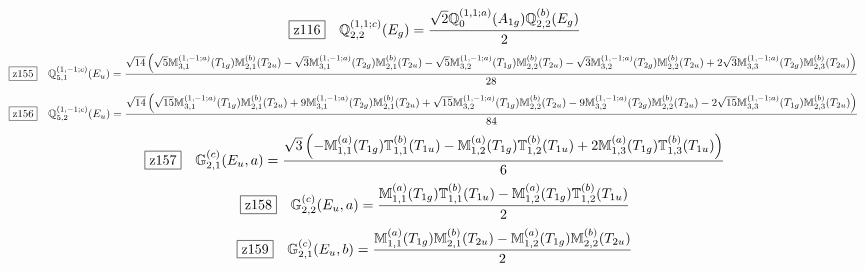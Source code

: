 \documentclass[fleqn,10pt,landscape]{jsarticle}
\begin{document}
\begin{dmath*}
\hspace*{3mm}\fbox{z116}\quad \mathbb{Q}_{2,2}^{(1,1;c)}(E_{g})=\frac{\sqrt{2} \mathbb{Q}_{0}^{(1,1;a)}(A_{1g}) \mathbb{Q}_{2,2}^{(b)}(E_{g})}{2}
\end{dmath*}
\begin{dmath*}
\hspace*{3mm}\fbox{z155}\quad \mathbb{Q}_{5,1}^{(1,-1;c)}(E_{u})=\frac{\sqrt{14} \left(\sqrt{5} \mathbb{M}_{3,1}^{(1,-1;a)}(T_{1g}) \mathbb{M}_{2,1}^{(b)}(T_{2u}) - \sqrt{3} \mathbb{M}_{3,1}^{(1,-1;a)}(T_{2g}) \mathbb{M}_{2,1}^{(b)}(T_{2u}) - \sqrt{5} \mathbb{M}_{3,2}^{(1,-1;a)}(T_{1g}) \mathbb{M}_{2,2}^{(b)}(T_{2u}) - \sqrt{3} \mathbb{M}_{3,2}^{(1,-1;a)}(T_{2g}) \mathbb{M}_{2,2}^{(b)}(T_{2u}) + 2 \sqrt{3} \mathbb{M}_{3,3}^{(1,-1;a)}(T_{2g}) \mathbb{M}_{2,3}^{(b)}(T_{2u})\right)}{28}
\end{dmath*}
\begin{dmath*}
\hspace*{3mm}\fbox{z156}\quad \mathbb{Q}_{5,2}^{(1,-1;c)}(E_{u})=\frac{\sqrt{14} \left(\sqrt{15} \mathbb{M}_{3,1}^{(1,-1;a)}(T_{1g}) \mathbb{M}_{2,1}^{(b)}(T_{2u}) + 9 \mathbb{M}_{3,1}^{(1,-1;a)}(T_{2g}) \mathbb{M}_{2,1}^{(b)}(T_{2u}) + \sqrt{15} \mathbb{M}_{3,2}^{(1,-1;a)}(T_{1g}) \mathbb{M}_{2,2}^{(b)}(T_{2u}) - 9 \mathbb{M}_{3,2}^{(1,-1;a)}(T_{2g}) \mathbb{M}_{2,2}^{(b)}(T_{2u}) - 2 \sqrt{15} \mathbb{M}_{3,3}^{(1,-1;a)}(T_{1g}) \mathbb{M}_{2,3}^{(b)}(T_{2u})\right)}{84}
\end{dmath*}
\begin{dmath*}
\hspace*{3mm}\fbox{z157}\quad \mathbb{G}_{2,1}^{(c)}(E_{u},a)=\frac{\sqrt{3} \left(- \mathbb{M}_{1,1}^{(a)}(T_{1g}) \mathbb{T}_{1,1}^{(b)}(T_{1u}) - \mathbb{M}_{1,2}^{(a)}(T_{1g}) \mathbb{T}_{1,2}^{(b)}(T_{1u}) + 2 \mathbb{M}_{1,3}^{(a)}(T_{1g}) \mathbb{T}_{1,3}^{(b)}(T_{1u})\right)}{6}
\end{dmath*}
\begin{dmath*}
\hspace*{3mm}\fbox{z158}\quad \mathbb{G}_{2,2}^{(c)}(E_{u},a)=\frac{\mathbb{M}_{1,1}^{(a)}(T_{1g}) \mathbb{T}_{1,1}^{(b)}(T_{1u}) - \mathbb{M}_{1,2}^{(a)}(T_{1g}) \mathbb{T}_{1,2}^{(b)}(T_{1u})}{2}
\end{dmath*}
\begin{dmath*}
\hspace*{3mm}\fbox{z159}\quad \mathbb{G}_{2,1}^{(c)}(E_{u},b)=\frac{\mathbb{M}_{1,1}^{(a)}(T_{1g}) \mathbb{M}_{2,1}^{(b)}(T_{2u}) - \mathbb{M}_{1,2}^{(a)}(T_{1g}) \mathbb{M}_{2,2}^{(b)}(T_{2u})}{2}
\end{dmath*}
\end{document}
